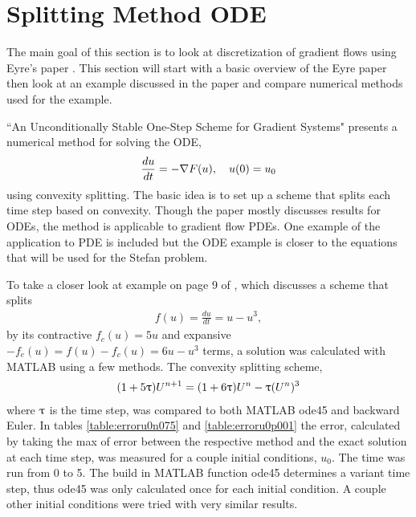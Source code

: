 
\section{Splitting Method ODE} \label{Sect:Splitting}

The main goal of this section is to look at discretization of gradient flows using Eyre's paper \parencite{Eyre}.  This section will start with a basic overview of the Eyre paper then look at an example discussed in the paper and compare numerical methods used for the example. 

``An Unconditionally Stable One-Step Scheme for Gradient Systems" presents a numerical method for solving the ODE, 
\begin{eqnarray}
\frac{du}{dt} = - {\nabla} F(u), \quad u(0)=u_0
\end{eqnarray}
using convexity splitting. The basic idea is to set up a scheme that splits each time step based on convexity. Though the paper mostly discusses results for ODEs, the method is applicable to gradient flow PDEs. One example of the application to PDE is included but the ODE example is closer to the equations that will be used for the Stefan problem. 

To take a closer look at example on page 9 of \cite{Eyre}, which discusses a scheme that splits 
%
\begin{eqnarray} \label{ODEexample}
f(u) = \frac{du}{dt} = u - u^3, 
\end{eqnarray}
%
by its contractive $f_c(u)={5}u$ and expansive $-f_e(u)=f(u)-f_c(u)={6}u-u^3$ terms, a solution was calculated with MATLAB using a few methods. The convexity splitting scheme, 
%
\begin{eqnarray} \label{equn scheme ac5}
(1+5{\uptau})U^{n+1}=(1+6{\uptau})U^n-{\uptau}(U^n)^3 
\end{eqnarray}
%
where ${\uptau}$ is the time step, was compared to both MATLAB ode45 and backward Euler. In tables \ref{table:erroru0n075} and \ref{table:erroru0p001} the error, calculated by taking the max of error between the respective method and the exact solution at each time step, was measured for a couple initial conditions, $u_0$. The time was run from 0 to 5. The build in MATLAB function ode45 determines a variant time step, thus ode45 was only calculated once for each initial condition. A couple other initial conditions were tried with very similar results. 

